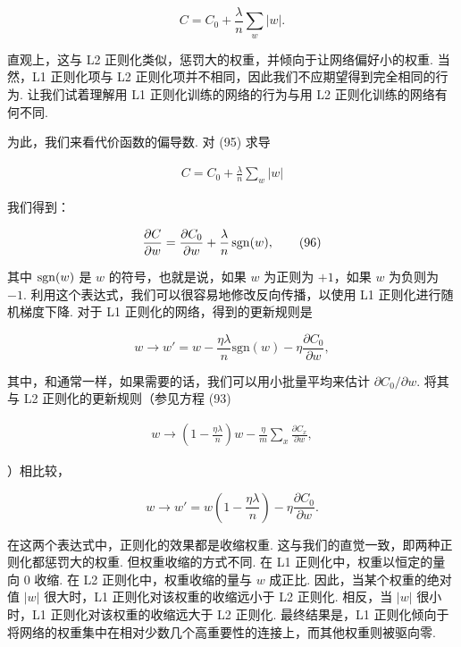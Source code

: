 \begin{equation}
C = C_0 + \frac{\lambda}{n} \sum_w |w|.
\tag{95}
\end{equation}

\noindent 直观上，这与 L2 正则化类似，惩罚大的权重，并倾向于让网络偏好小的权重. 当然，L1 正则化项与 L2 正则化项并不相同，因此我们不应期望得到完全相同的行为. 让我们试着理解用 L1 正则化训练的网络的行为与用 L2 正则化训练的网络有何不同.

为此，我们来看代价函数的偏导数. 对 (95) 求导

\begin{align*}
C = C_0 + \frac{\lambda}{n} \sum_w |w| \nonumber
\end{align*}

\noindent 我们得到：

\begin{equation}
\frac{\partial C}{\partial w} = \frac{\partial C_0}{\partial w} + \frac{\lambda}{n} \, {\rm sgn}(w),
\tag{96}
\end{equation}

\noindent 其中 ${\rm sgn}(w)$ 是 $w$ 的符号，也就是说，如果 $w$ 为正则为 $+1$，如果 $w$ 为负则为 $-1$. 利用这个表达式，我们可以很容易地修改反向传播，以使用 L1 正则化进行随机梯度下降. 对于 L1 正则化的网络，得到的更新规则是

\begin{equation}
w \rightarrow w' = w-\frac{\eta \lambda}{n} \mbox{sgn}(w) - \eta \frac{\partial C_0}{\partial w},
\tag{97}
\end{equation}

\noindent 其中，和通常一样，如果需要的话，我们可以用小批量平均来估计 $\partial C_0 / \partial w$. 将其与 L2 正则化的更新规则（参见方程 (93)

\begin{align*}
w \rightarrow \left(1-\frac{\eta \lambda}{n}\right) w -\frac{\eta}{m} \sum_x \frac{\partial C_x}{\partial w}, \nonumber
\end{align*}

\noindent ）相比较，

\begin{equation}
w \rightarrow w' = w\left(1 - \frac{\eta \lambda}{n} \right) - \eta \frac{\partial C_0}{\partial w}.
\tag{98}
\end{equation}

\noindent 在这两个表达式中，正则化的效果都是收缩权重. 这与我们的直觉一致，即两种正则化都惩罚大的权重. 但权重收缩的方式不同. 在 L1 正则化中，权重以恒定的量向 $0$ 收缩. 在 L2 正则化中，权重收缩的量与 $w$ 成正比. 因此，当某个权重的绝对值 $|w|$ 很大时，L1 正则化对该权重的收缩远小于 L2 正则化. 相反，当 $|w|$ 很小时，L1 正则化对该权重的收缩远大于 L2 正则化. 最终结果是，L1 正则化倾向于将网络的权重集中在相对少数几个高重要性的连接上，而其他权重则被驱向零.


